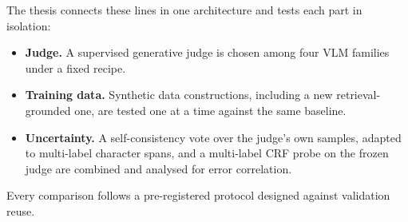 The thesis connects these lines in one architecture and tests each part in isolation:
\begin{itemize}
    \item \textbf{Judge.} A supervised generative judge is chosen among four VLM families under a fixed recipe.
    \item \textbf{Training data.} Synthetic data constructions, including a new retrieval-grounded one, are tested one at a time against the same baseline.
    \item \textbf{Uncertainty.} A self-consistency vote over the judge's own samples, adapted to multi-label character spans, and a multi-label CRF probe on the frozen judge are combined and analysed for error correlation.
\end{itemize}
Every comparison follows a pre-registered protocol designed against validation reuse.
